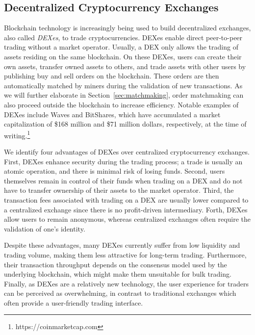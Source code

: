 \subsection{Decentralized Cryptocurrency Exchanges}
Blockchain technology is increasingly being used to build decentralized exchanges, also called \emph{DEXes}, to trade cryptocurrencies.
DEXes enable direct peer-to-peer trading without a market operator.
Usually, a DEX only allows the trading of assets residing on the same blockchain.
On these DEXes, users can create their own assets, transfer owned assets to others, and trade assets with other users by publishing buy and sell orders on the blockchain.
These orders are then automatically matched by miners during the validation of new transactions.
As we will further elaborate in Section~\ref{sec:matchmaking}, order matchmaking can also proceed outside the blockchain to increase efficiency.
Notable examples of DEXes include Waves and BitShares, which have accumulated a market capitalization of \$168 million and \$71 million dollars, respectively, at the time of writing.\footnote{https://coinmarketcap.com}

We identify four advantages of DEXes over centralized cryptocurrency exchanges.
First, DEXes enhance security during the trading process; a trade is usually an atomic operation, and there is minimal risk of losing funds.
Second, users themselves remain in control of their funds when trading on a DEX and do not have to transfer ownership of their assets to the market operator.
Third, the transaction fees associated with trading on a DEX are usually lower compared to a centralized exchange since there is no profit-driven intermediary.
Forth, DEXes allow users to remain anonymous, whereas centralized exchanges often require the validation of one's identity.

Despite these advantages, many DEXes currently suffer from low liquidity and trading volume, making them less attractive for long-term trading.
Furthermore, their transaction throughput depends on the consensus model used by the underlying blockchain, which might make them unsuitable for bulk trading.
Finally, as DEXes are a relatively new technology, the user experience for traders can be perceived as overwhelming, in contrast to traditional exchanges which often provide a user-friendly trading interface.

